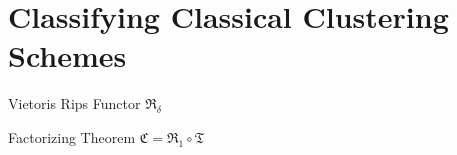 \chapter{Classifying Classical Clustering Schemes}

\begin{definition}{Vietoris Rips Functor}{}
$\mathfrak{R_\delta}$
\end{definition}

\begin{theorem}{Factorizing Theorem}{}
$\mathfrak{C} = \mathfrak{R}_1 \circ \mathfrak{T}$
\end{theorem}
